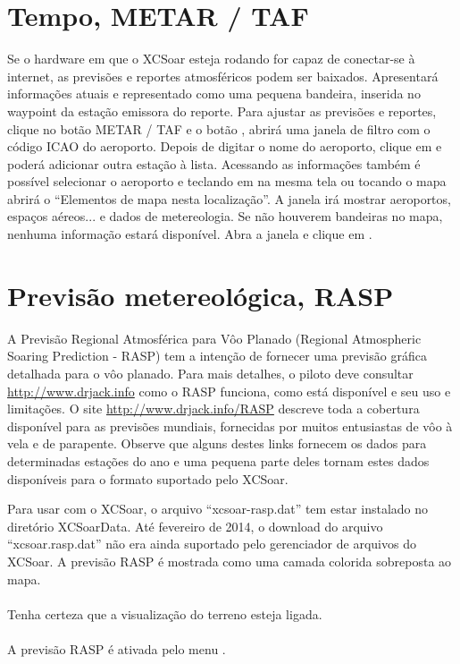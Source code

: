 \section{Tempo, METAR / TAF}\label{sec:metar-taf}

Se o hardware em que o XCSoar esteja rodando for capaz de conectar-se à internet, as previsões e reportes atmosféricos podem ser baixados.    Apresentará informações atuais e representado como uma pequena bandeira, inserida no waypoint da estação emissora do reporte. 
Para ajustar as previsões e reportes, clique no botão METAR / TAF e o botão
 , abrirá uma janela de filtro com o código ICAO do aeroporto.  Depois de digitar o nome do aeroporto, clique em  e poderá adicionar outra estação à lista.  Acessando as informações também é possível selecionar o aeroporto e teclando em  na mesma tela ou tocando o mapa abrirá o “Elementos de mapa nesta localização”.  A janela irá mostrar aeroportos, espaços aéreos... e dados de metereologia. Se não houverem bandeiras no mapa, nenhuma informação estará disponível.  Abra a janela e clique em .  

\section{Previsão metereológica, RASP}\label{sec:weather-forecast}

A Previsão Regional Atmosférica para Vôo Planado (Regional Atmospheric Soaring Prediction - RASP) tem a intenção de fornecer uma previsão gráfica detalhada para o vôo planado.  Para mais detalhes, o piloto deve consultar  \url{http://www.drjack.info} como o RASP funciona, como está disponível e seu uso e limitações.  
O site \url{http://www.drjack.info/RASP} descreve toda a cobertura disponível para as previsões mundiais, fornecidas por muitos entusiastas de vôo à vela e de parapente.  Observe que alguns destes links fornecem os dados para determinadas estações do ano e uma pequena parte deles tornam estes dados disponíveis para o formato suportado pelo XCSoar.

Para usar com o XCSoar, o arquivo “xcsoar-rasp.dat” tem estar instalado no diretório XCSoarData.  Até fevereiro de 2014, o download do arquivo “xcsoar.rasp.dat” não era ainda suportado pelo gerenciador de arquivos do XCSoar. A previsão RASP é mostrada como uma camada colorida sobreposta ao mapa. \\ \\
Tenha certeza que a visualização do terreno esteja ligada. \tip{} \\ \\
A previsão RASP é ativada pelo menu   
.

